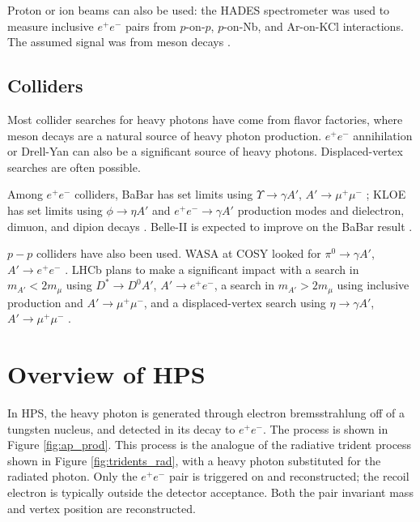 Proton or ion beams can also be used: the HADES spectrometer was used to measure inclusive $e^+e^-$ pairs from $p$-on-$p$, $p$-on-Nb, and Ar-on-KCl interactions.
The assumed signal was from meson decays \cite{hades_collaboration_searching_2013}.

\subsection{Colliders}
Most collider searches for heavy photons have come from flavor factories, where meson decays are a natural source of heavy photon production.
$e^+e^-$ annihilation or Drell-Yan can also be a significant source of heavy photons.
Displaced-vertex searches are often possible.

Among $e^+e^-$ colliders, BaBar has set limits using $\Upsilon \to \gamma A'$, $A'\to\mu^+\mu^-$ \cite{babar_collaboration_search_2009,soffer_constraints_2014}; KLOE has set limits using $\phi\to \eta A'$ and $e^+e^- \to \gamma A'$ production modes and dielectron, dimuon, and dipion decays \cite{collaboration_search_2012,collaboration_limit_2013,babusci_search_2014,anastasi_limit_2015,collaboration_limit_2016}.
Belle-II is expected to improve on the BaBar result \cite{inguglia_belle_2016}.

$p-p$ colliders have also been used. WASA at COSY looked for $\pi^0 \to \gamma A'$, $A'\to e^+e^-$ \cite{collaboration_search_2013}.
LHCb plans to make a significant impact with a search in $m_{A'}<2m_\mu$ using $D^* \to D^0 A'$, $A'\to e^+e^-$, a search in $m_{A'}>2m_\mu$ using inclusive production and $A'\to \mu^+\mu^-$, and a displaced-vertex search using $\eta \to \gamma A'$, $A'\to \mu^+\mu^-$ \cite{ilten_dark_2015,ilten_inclusive_2016}.

\section{Overview of HPS}

In HPS, the heavy photon is generated through electron bremsstrahlung off of a tungsten nucleus, and detected in its decay to $e^+e^-$.
The process is shown in Figure \ref{fig:ap_prod}.
This process is the analogue of the radiative trident process shown in Figure \ref{fig:tridents_rad}, with a heavy photon substituted for the radiated photon.
Only the $e^+e^-$ pair is triggered on and reconstructed; the recoil electron is typically outside the detector acceptance.
Both the pair invariant mass and vertex position are reconstructed.

